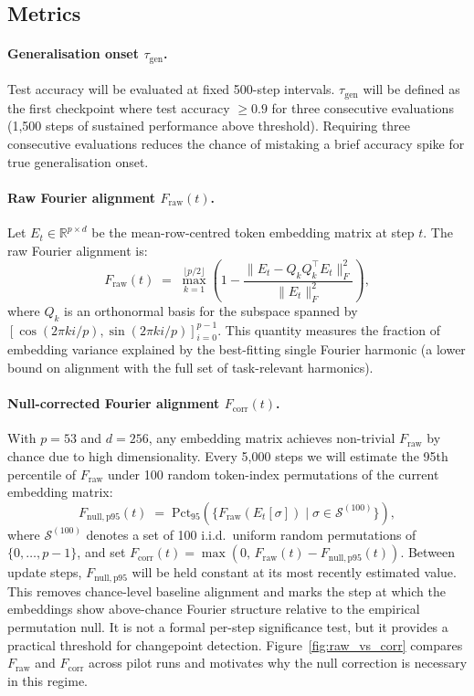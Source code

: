 \documentclass[12pt,openany,a4paper]{book}
\newcommand{\taug}{\tau_{\mathrm{gen}}}
\newcommand{\fcorr}{F_{\mathrm{corr}}}
\begin{document}
\subsection{Metrics}

\paragraph{Generalisation onset $\taug$.}
Test accuracy will be evaluated at fixed 500-step intervals.
$\taug$ will be defined as the first checkpoint where test accuracy
$\geq 0.9$ for three consecutive evaluations (1{,}500 steps of
sustained performance above threshold).
Requiring three consecutive evaluations reduces the chance of mistaking a brief accuracy spike for true generalisation onset.

\paragraph{Raw Fourier alignment $F_{\mathrm{raw}}(t)$.}
Let $E_t \in \mathbb{R}^{p \times d}$ be the mean-row-centred token
embedding matrix at step $t$.
The raw Fourier alignment is:
\begin{equation}
  F_{\mathrm{raw}}(t) \;=\;
  \max_{k=1}^{\lfloor p/2\rfloor}
  \!\left(1 - \frac{\|E_t - Q_k Q_k^\top E_t\|_F^2}
  {\|E_t\|_F^2}\right),
  \label{eq:f_raw}
\end{equation}
where $Q_k$ is an orthonormal basis for the subspace spanned by
$[\cos(2\pi k i/p),\sin(2\pi k i/p)]_{i=0}^{p-1}$.
This quantity measures the fraction of embedding variance explained
by the best-fitting single Fourier harmonic (a lower bound on
alignment with the full set of task-relevant harmonics).

\paragraph{Null-corrected Fourier alignment $\fcorr(t)$.}
With $p=53$ and $d=256$, any embedding matrix achieves non-trivial
$F_{\mathrm{raw}}$ by chance due to high dimensionality.
Every 5{,}000 steps we will estimate the 95th percentile of
$F_{\mathrm{raw}}$ under 100 random token-index permutations of the
current embedding matrix:
\begin{equation}
  F_{\mathrm{null,p95}}(t) \;=\;
  \mathrm{Pct}_{95}\!\left(
    \{F_{\mathrm{raw}}(E_t[\sigma]) \mid \sigma \in \mathcal{S}^{(100)}\}
  \right),
\end{equation}
where $\mathcal{S}^{(100)}$ denotes a set of 100 i.i.d.\ uniform random permutations of $\{0,\dots,p{-}1\}$,
and set $\fcorr(t) = \max(0,\, F_{\mathrm{raw}}(t) - F_{\mathrm{null,p95}}(t))$.
Between update steps, $F_{\mathrm{null,p95}}$ will be held constant at its
most recently estimated value.
This removes chance-level baseline alignment and marks the step at which the embeddings show above-chance Fourier structure relative to the empirical permutation null. It is not a formal per-step significance test, but it provides a practical threshold for changepoint detection.
Figure~\ref{fig:raw_vs_corr} compares $F_{\mathrm{raw}}$ and $\fcorr$ across pilot runs and motivates why the null correction is necessary in this regime.
\end{document}
